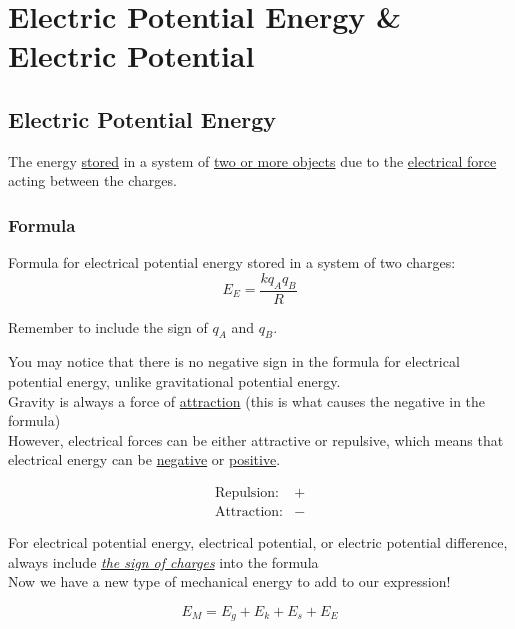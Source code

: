 \section{Electric Potential Energy \& Electric Potential}
\subsection{Electric Potential Energy}
\begin{definition}
     The energy \underline{stored} in a system of \underline{two or more objects} due to the \underline{electrical force} acting between the charges.
\end{definition}

\subsubsection{Formula}
Formula for electrical potential energy stored in a system of two charges:
\begin{equation*}
    E_E = \frac{k q_A q_B}{R}
\end{equation*}
\begin{remark}
    Remember to include the sign of $q_A$ and $q_B$.
\end{remark}

You may notice that there is no negative sign in the formula for electrical potential energy, unlike gravitational potential energy.\\

Gravity is always a force of \underline{attraction} (this is what causes the negative in the formula)\\

However, electrical forces can be either attractive or repulsive, which means that electrical energy can be \underline{negative} or \underline{positive}.

\begin{align*}
    \text{Repulsion:} &+ \\
    \text{Attraction:} &-
\end{align*}

For electrical potential energy, electrical potential, or electric potential difference, always include 
\textit{\underline{the sign of charges}} into the formula\\

Now we have a new type of mechanical energy to add to our expression!

\begin{equation*}
    E_M = E_g + E_k + E_s + E_E
\end{equation*}

